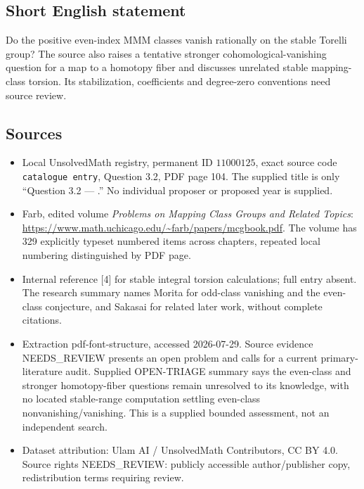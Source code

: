 \documentclass[11pt]{article}
\begin{document}
\subsection{Short English statement}
Do the positive even-index MMM classes vanish rationally on the stable Torelli group? The source also raises a tentative stronger cohomological-vanishing question for a map to a homotopy fiber and discusses unrelated stable mapping-class torsion. Its stabilization, coefficients and degree-zero conventions need source review.
\subsection{Sources}
\begin{itemize}
\item Local UnsolvedMath registry, permanent ID \(11000125\), exact source code \texttt{catalogue entry}, Question 3.2, PDF page 104. The supplied title is only ``Question 3.2 --- .'' No individual proposer or proposed year is supplied.
\item Farb, edited volume \emph{Problems on Mapping Class Groups and Related Topics}: \url{https://www.math.uchicago.edu/~farb/papers/mcgbook.pdf}. The volume has 329 explicitly typeset numbered items across chapters, repeated local numbering distinguished by PDF page.
\item Internal reference [4] for stable integral torsion calculations; full entry absent. The research summary names Morita for odd-class vanishing and the even-class conjecture, and Sakasai for related later work, without complete citations.
\item Extraction pdf-font-structure, accessed 2026-07-29. Source evidence NEEDS\_REVIEW presents an open problem and calls for a current primary-literature audit. Supplied OPEN-TRIAGE summary says the even-class and stronger homotopy-fiber questions remain unresolved to its knowledge, with no located stable-range computation settling even-class nonvanishing/vanishing. This is a supplied bounded assessment, not an independent search.
\item Dataset attribution: Ulam AI / UnsolvedMath Contributors, CC BY 4.0. Source rights NEEDS\_REVIEW: publicly accessible author/publisher copy, redistribution terms requiring review.
\end{itemize}
\end{document}
